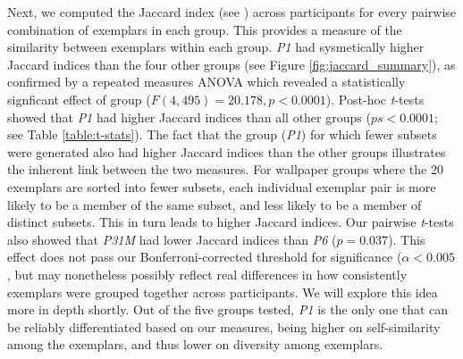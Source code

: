 \documentclass[11pt, twoside]{article}
\begin{document}
Next, we computed the Jaccard index (see ) across participants for every pairwise combination of exemplars in each group. This provides a measure of the similarity between exemplars within each group. \textit{P1} had sysmetically higher Jaccard indices than the four other groups (see Figure \ref{fig:jaccard_summary}), as confirmed by a repeated measures ANOVA which revealed a statistically signficant effect of group ($F(4, 495)=20.178, p < 0.0001$). Post-hoc \textit{t}-tests showed that \textit{P1} had higher Jaccard indices than all other groups ($ps < 0.0001$; see Table \ref{table:t-stats}). The fact that the group (\textit{P1}) for which fewer subsets were generated also had higher Jaccard indices than the other groups illustrates the inherent link between the two measures. For wallpaper groups where the 20 exemplars are sorted into fewer subsets, each individual exemplar pair is more likely to be a member of the same subset, and less likely to be a member of distinct subsets. This in turn leads to higher Jaccard indices. Our pairwise \textit{t}-tests also showed that \textit{P31M} had lower Jaccard indices than \textit{P6} ($p = 0.037$). This effect does not pass our Bonferroni-corrected threshold for significance ($\alpha < 0.005$, but may nonetheless possibly reflect real differences in how consistently exemplars were grouped together across participants. We will explore this idea more in depth shortly. Out of the five groups tested, \textit{P1} is the only one that can be reliably differentiated based on our measures, being higher on self-similarity among the exemplars, and thus lower on diversity among exemplars. 
\end{document}
